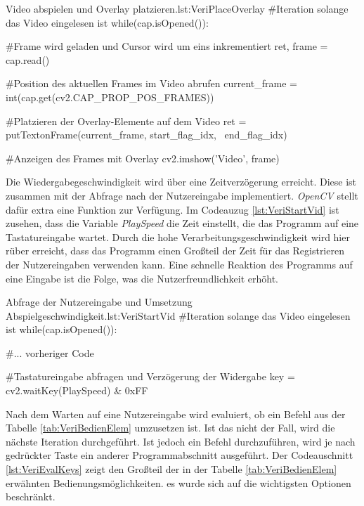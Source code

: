 \begin{pythoncode}{Video abspielen und Overlay platzieren.}{lst:VeriPlaceOverlay}
#Iteration solange das Video eingelesen ist
while(cap.isOpened()):

    #Frame wird geladen und Cursor wird um eins inkrementiert
    ret, frame = cap.read()

    #Position des aktuellen Frames im Video abrufen
    current_frame = int(cap.get(cv2.CAP_PROP_POS_FRAMES))

    #Platzieren der Overlay-Elemente auf dem Video 
    ret = putTextonFrame(current_frame, start_flag_idx, \ 
            end_flag_idx)
    
    #Anzeigen des Frames mit Overlay
    cv2.imshow('Video', frame)

\end{pythoncode}

Die Wiedergabegeschwindigkeit wird über eine Zeitverzögerung erreicht. Diese ist zusammen mit der Abfrage nach der Nutzereingabe implementiert. \textit{OpenCV} stellt dafür extra eine Funktion zur Verfügung. Im Codeauzug \ref{lst:VeriStartVid} ist zusehen, dass die Variable \textit{PlaySpeed} die Zeit einstellt, die das Programm auf eine Tastatureingabe wartet. Durch die hohe Verarbeitungsgeschwindigkeit wird hier rüber erreicht, dass das Programm einen Großteil der Zeit für das Registrieren der Nutzereingaben verwenden kann. Eine schnelle Reaktion des Programms auf eine Eingabe ist die Folge, was die Nutzerfreundlichkeit erhöht.

\begin{pythoncode}{Abfrage der Nutzereingabe und Umsetzung Abspielgeschwindigkeit.}{lst:VeriStartVid}
#Iteration solange das Video eingelesen ist
while(cap.isOpened()):

     #... vorheriger Code

    #Tastatureingabe abfragen und Verzögerung der Widergabe 
    key = cv2.waitKey(PlaySpeed) & 0xFF

\end{pythoncode}

Nach dem Warten auf eine Nutzereingabe wird evaluiert, ob ein Befehl aus der Tabelle \ref{tab:VeriBedienElem} umzusetzen ist. Ist das nicht der Fall, wird die nächste Iteration durchgeführt. Ist jedoch ein Befehl durchzuführen, wird je nach gedrückter Taste ein anderer Programmabschnitt ausgeführt. Der Codeauschnitt \ref{lst:VeriEvalKeys} zeigt den Großteil der in der Tabelle \ref{tab:VeriBedienElem} erwähnten Bedienungsmöglichkeiten. es wurde sich auf die wichtigsten Optionen beschränkt. \par

